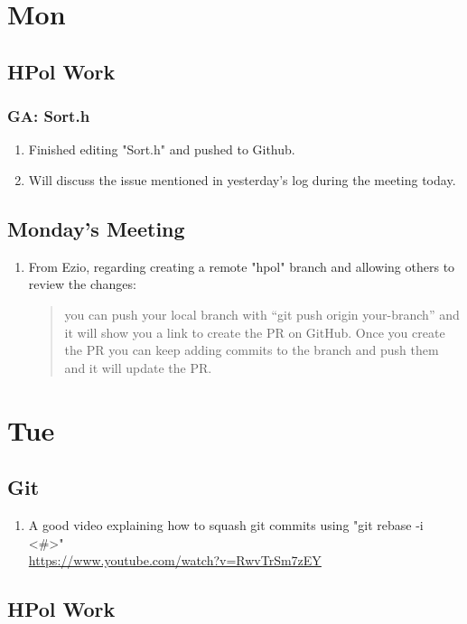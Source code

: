 \documentclass[12pt,letterpaper]{article}
\begin{document}
\section{Mon}
\subsection{HPol Work}
\subsubsection{GA: Sort.h}
\begin{enumerate}
  \item Finished editing "Sort.h" and pushed to Github.
  \item Will discuss the issue mentioned in yesterday's log during the meeting today.
\end{enumerate}

\subsection{Monday's Meeting}
\begin{enumerate}
  \item From Ezio, regarding creating a remote "hpol" branch and allowing others to 
    review the changes:
    \begin{quote}
    you can push your local branch with ``git push origin your-branch'' and it
    will show you a link to create the PR on GitHub. Once you create the PR you
    can keep adding commits to the branch and push them and it will update the PR.
    \end{quote}
\end{enumerate}

\section{Tue}
\subsection{Git}
\begin{enumerate}
  \item A good video explaining how to squash git commits using "git rebase -i <#>"\\
    \url{https://www.youtube.com/watch?v=RwvTrSm7zEY}
\end{enumerate}
\subsection{HPol Work}
\end{document}
